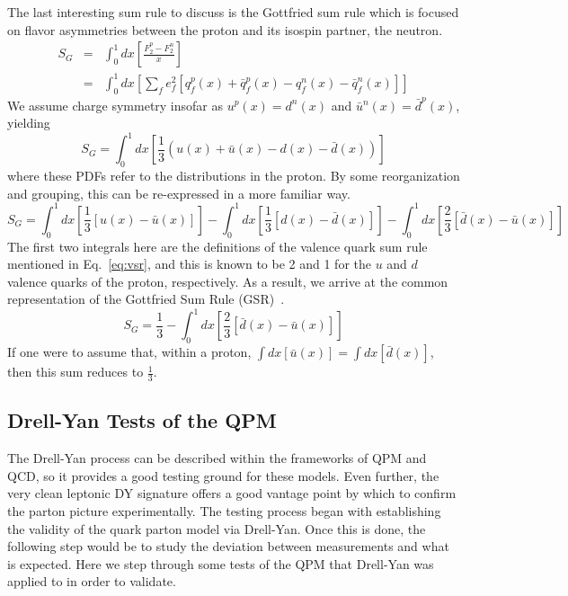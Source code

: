 The last interesting sum rule to discuss is the Gottfried sum rule which is focused on flavor asymmetries between the proton and its isospin partner, the neutron.
\begin{eqnarray}
S_G & = & \int_0^1 dx \left[\frac{F_2^p - F_2^n}{x}\right] \\
& = & \int_0^1 dx \left[ \sum\limits_f e_f^2 [q_f^p(x) + \bar{q}_f^p(x) - q_f^n(x) - \bar{q}_f^n(x)] \right]
\end{eqnarray}
We assume charge symmetry insofar as $u^p(x) = d^n(x)$ and $\bar{u}^n (x) = \bar{d}^p(x)$, yielding
\begin{equation}
S_G = \int_0^1 dx \left[ \frac{1}{3} (u(x) + \bar{u}(x) - d(x) - \bar{d}(x)) \right]
\end{equation}
where these PDFs refer to the distributions in the proton. By some reorganization and grouping, this can be re-expressed in a more familiar way.
\begin{equation}
S_G = \int_0^1 dx \left[\frac{1}{3} [u(x) - \bar{u}(x)] \right] - 
\int_0^1 dx \left[\frac{1}{3} [d(x) - \bar{d}(x)] \right] -
\int_0^1 dx \left[\frac{2}{3} [\bar{d}(x) - \bar{u}(x)] \right]
\end{equation}
The first two integrals here are the definitions of the valence quark sum rule mentioned in Eq.~\ref{eq:vsr}, and this is known to be 2 and 1 for the $u$ and $d$ valence quarks of the proton, respectively. As a result, we arrive at the common representation of the Gottfried Sum Rule (GSR)~\cite{Gottfried:1967kk}.
\begin{equation}
S_G = \frac{1}{3} - \int_0^1 dx \left[ \frac{2}{3} [\bar{d}(x) - \bar{u}(x)] \right]
\label{eq:gsr}
\end{equation}
If one were to assume that, within a proton, $\int dx [\bar{u}(x)] = \int dx[\bar{d}(x)]$, then this sum reduces to $\frac{1}{3}$.

\subsection{Drell-Yan Tests of the QPM}

The Drell-Yan process can be described within the frameworks of QPM and QCD, so it provides a good testing ground for these models. Even further, the very clean leptonic DY signature offers a good vantage point by which to confirm the parton picture experimentally. The testing process began with establishing the validity of the quark parton model via Drell-Yan. Once this is done, the following step would be to study the deviation between measurements and what is expected. Here we step through some tests of the QPM that Drell-Yan was applied to in order to validate.

